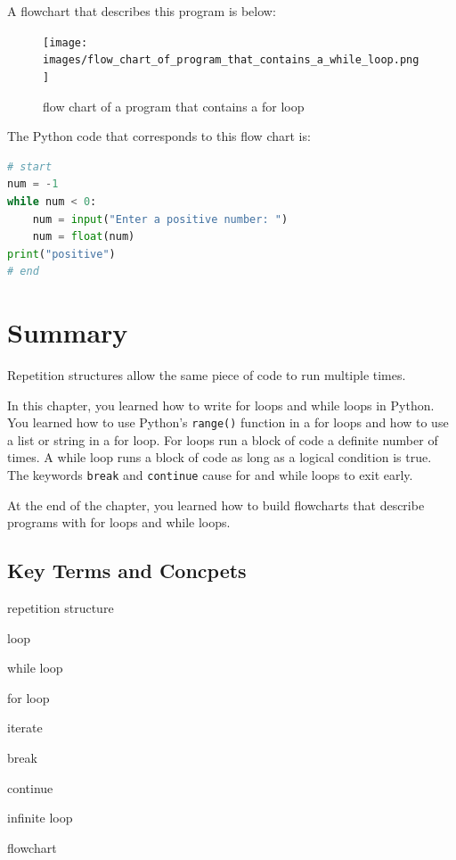 \documentclass{book}
\newenvironment{key_terms}{\begin{multicols}{3}}{\end{multicols}} %
\begin{document}
A flowchart that describes this program is below:

\begin{figure}
\centering
\texttt{[image: images/flow\_chart\_of\_program\_that\_contains\_a\_while\_loop.png]}
\caption{flow chart of a program that contains a for loop}
\end{figure}

The Python code that corresponds to this flow chart is:

\begin{lstlisting}[language=Python]
# start
num = -1
while num < 0:
    num = input("Enter a positive number: ")
    num = float(num)
print("positive")
# end
\end{lstlisting}
    




    
        \newpage
        \section{Summary}\label{summary}

    




    
        Repetition structures allow the same piece of code to run multiple
times.

In this chapter, you learned how to write for loops and while loops in
Python. You learned how to use Python's \lstinline!range()! function in
a for loops and how to use a list or string in a for loop. For loops run
a block of code a definite number of times. A while loop runs a block of
code as long as a logical condition is true. The keywords
\lstinline!break! and \lstinline!continue! cause for and while loops to
exit early.

At the end of the chapter, you learned how to build flowcharts that
describe programs with for loops and while loops.
    




    
        \subsection{Key Terms and Concpets}\label{key-terms-and-concpets}
    




    
        \begin{key_terms}
        repetition structure

loop

while loop

for loop

iterate

break

continue

infinite loop

flowchart
        \end{key_terms}
\end{document}
